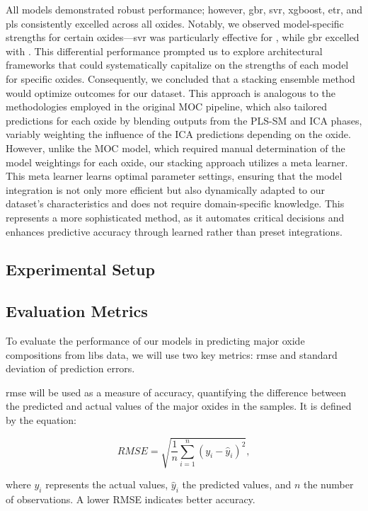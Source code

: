 All models demonstrated robust performance; however, \gls{gbr}, \gls{svr}, \gls{xgboost}, \gls{etr}, and \gls{pls} consistently excelled across all oxides.
Notably, we observed model-specific strengths for certain oxides—\gls{svr} was particularly effective for , while \gls{gbr} excelled with .
This differential performance prompted us to explore architectural frameworks that could systematically capitalize on the strengths of each model for specific oxides.
Consequently, we concluded that a stacking ensemble method would optimize outcomes for our dataset.
This approach is analogous to the methodologies employed in the original MOC pipeline, which also tailored predictions for each oxide by blending outputs from the PLS-SM and ICA phases, variably weighting the influence of the ICA predictions depending on the oxide.
However, unlike the MOC model, which required manual determination of the model weightings for each oxide, our stacking approach utilizes a meta learner.
This meta learner learns optimal parameter settings, ensuring that the model integration is not only more efficient but also dynamically adapted to our dataset's characteristics and does not require domain-specific knowledge.
This represents a more sophisticated method, as it automates critical decisions and enhances predictive accuracy through learned rather than preset integrations.

\subsection{Experimental Setup}

\subsection{Evaluation Metrics}
To evaluate the performance of our models in predicting major oxide compositions from \gls{libs} data, we will use two key metrics: \gls{rmse} and standard deviation of prediction errors.

\gls{rmse} will be used as a measure of accuracy, quantifying the difference between the predicted and actual values of the major oxides in the samples. It is defined by the equation:

\begin{equation}
    RMSE = \sqrt{\frac{1}{n} \sum_{i=1}^{n} (y_i - \hat{y}_i)^2},
\end{equation}

where $y_i$ represents the actual values, $\hat{y}_i$ the predicted values, and $n$ the number of observations. A lower RMSE indicates better accuracy.

